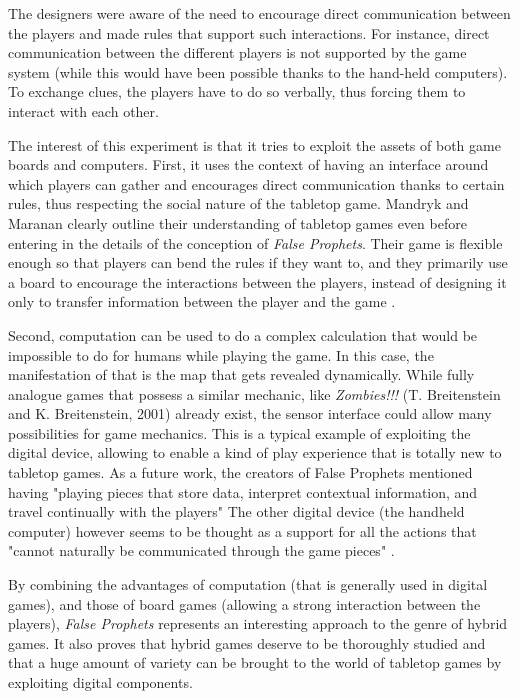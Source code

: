 The designers were aware of the need to encourage direct communication between the players and made rules that support such interactions. For instance, direct communication between the different players is not supported by the game system (while this would have been possible thanks to the hand-held computers). To exchange clues, the players have to do so verbally, thus forcing them to interact with each other. 

The interest of this experiment is that it tries to exploit the assets of both game boards and computers. First, it uses the context of having an interface around which players can gather and encourages direct communication thanks to certain rules, thus respecting the social nature of the tabletop game. Mandryk and Maranan clearly outline their understanding of tabletop games even before entering in the details of the conception of \textit{False Prophets}. Their game is flexible enough so that players can bend the rules if they want to, and they primarily use a board to encourage the interactions between the players, instead of designing it only to transfer information between the player and the game \cite{art:prophets}.

Second, computation can be used to do a complex calculation that would be impossible to do for humans while playing the game. In this case, the manifestation of that is the map that gets revealed dynamically.  While fully analogue games  that possess a similar mechanic, like \textit{Zombies!!!} (T. Breitenstein and K. Breitenstein, 2001) \cite{game:zombies} already exist, the sensor interface could allow many possibilities for game mechanics. This is a typical example of exploiting the digital device, allowing to enable a kind of play experience that is totally new to tabletop games. As a future work, the creators of False Prophets mentioned having "playing pieces that store data, interpret contextual information, and travel continually with the players" The other digital device (the handheld computer) however seems to be thought as a support for all the actions that "cannot naturally be communicated through the game pieces" \cite{art:prophets}.

By combining the advantages of computation (that is generally used in digital games), and those of board games (allowing a strong interaction between the players), \textit{False Prophets} represents an interesting approach to the genre of hybrid games. It also proves that hybrid games deserve to be thoroughly studied and that a huge amount of variety can be brought to the world of tabletop games by exploiting digital components.


